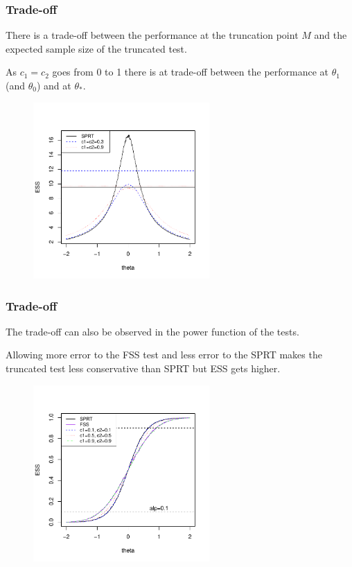 \documentclass[10pt]{beamer}
\begin{document}
\begin{frame}
\frametitle{Trade-off}

There is a trade-off between the performance at the truncation point $M$ and the expected sample size of the truncated test.


As $c_1 = c_2$ goes from 0 to 1 there is at trade-off between the performance at $\theta_1$ (and $\theta_0$) and at $\theta_*$.

\begin{figure}
\centering
\includegraphics[height=0.6\textheight, width=0.6\textwidth]{trade-off.pdf}
\end{figure}

\end{frame}

\begin{frame}
\frametitle{Trade-off}

The trade-off can also be observed in the power function of the tests.

Allowing more error to the FSS test and less error to the SPRT makes the truncated test less conservative than SPRT but ESS gets higher.

\begin{figure}
\centering
\includegraphics[height=0.7\textheight, width=0.6\textwidth]{images/PowerFunction.pdf}
\end{figure}

\end{frame}
\end{document}
